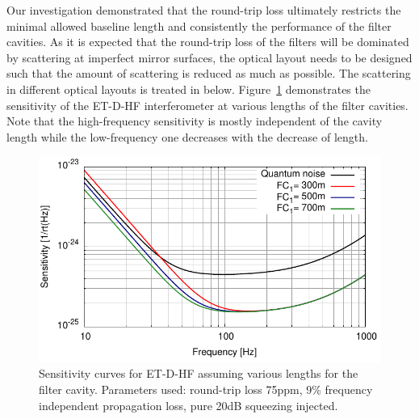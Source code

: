 Our investigation demonstrated that the round-trip loss ultimately restricts the minimal allowed baseline length and consistently the performance of the filter cavities. As it is expected that the round-trip loss of the filters will be dominated by scattering at imperfect mirror surfaces, the optical layout needs to be designed such that the amount of scattering is reduced as much as possible. The scattering in different optical layouts is treated in below.
Figure~\ref{fig:sensETDHF} demonstrates the sensitivity of the ET-D-HF interferometer at various lengths of the filter cavities. Note that the high-frequency sensitivity is mostly independent of the cavity length while the low-frequency one decreases with the decrease of length.
\begin{figure}[ht]
\centering
\includegraphics{./Sec_Optics/ET-D-HF-FCs.pdf}
\caption{Sensitivity curves for ET-D-HF assuming various lengths for the filter cavity. Parameters used: round-trip loss 75ppm, 9\% frequency independent propagation loss, pure 20dB squeezing injected.}
\label{fig:sensETDHF}
\end{figure}


